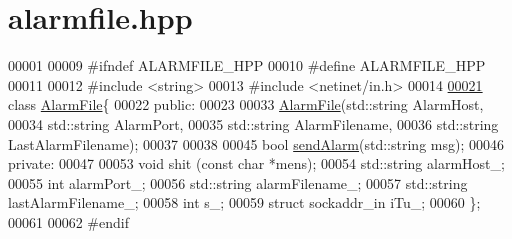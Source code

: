 \hypertarget{alarmfile_8hpp_source}{}\section{alarmfile.\+hpp}
\label{alarmfile_8hpp_source}

\begin{DoxyCode}
00001 
00009 \textcolor{preprocessor}{#ifndef ALARMFILE\_HPP}
00010 \textcolor{preprocessor}{#define ALARMFILE\_HPP}
00011 
00012 \textcolor{preprocessor}{#include <string>}
00013 \textcolor{preprocessor}{#include <netinet/in.h>}
00014 
\hyperlink{classAlarmFile}{00021} \textcolor{keyword}{class }\hyperlink{classAlarmFile}{AlarmFile}\{
00022 \textcolor{keyword}{public}:
00023 
00033   \hyperlink{classAlarmFile_ab5b7a78583764cd70d8b5b93a243439d}{AlarmFile}(std::string AlarmHost,
00034            std::string AlarmPort,
00035            std::string AlarmFilename,
00036            std::string LastAlarmFilename);
00037 
00038 
00045   \textcolor{keywordtype}{bool} \hyperlink{classAlarmFile_a37fd701cca3c3458a3009b508383947b}{sendAlarm}(std::string msg);
00046 \textcolor{keyword}{private}:
00047 
00053   \textcolor{keywordtype}{void} shit (\textcolor{keyword}{const} \textcolor{keywordtype}{char} *mens);
00054   std::string alarmHost\_; 
00055   \textcolor{keywordtype}{int} alarmPort\_; 
00056   std::string alarmFilename\_; 
00057   std::string lastAlarmFilename\_; 
00058   \textcolor{keywordtype}{int} s\_; 
00059   \textcolor{keyword}{struct }sockaddr\_in iTu\_; 
00060 \};
00061 
00062 \textcolor{preprocessor}{#endif}
\end{DoxyCode}
